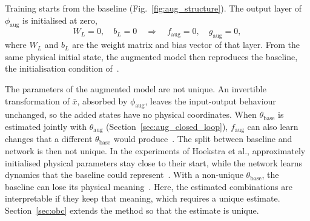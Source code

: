 Training starts from the baseline (Fig.~\ref{fig:aug_structure}).
The output layer of $\phi_{\mathrm{aug}}$ is initialised at zero,
\begin{equation}
 W_L=0,\quad b_L=0
 \quad\Longrightarrow\quad
 f_{\mathrm{aug}}=0,\quad g_{\mathrm{aug}}=0,
 \label{eq:aug_zero_init}
\end{equation}
where $W_L$ and $b_L$ are the weight matrix and bias vector of that layer.
From the same physical initial state, the augmented model then reproduces the
baseline, the initialisation condition of~\cite[Eq.~(29)]{hoekstra2026lfr}.

The parameters of the augmented model are not unique.
An invertible transformation of $\bar x$, absorbed by $\phi_{\mathrm{aug}}$,
leaves the input-output behaviour unchanged, so the added states have no
physical coordinates.
When $\theta_{\mathrm{base}}$ is estimated jointly with $\theta_{\mathrm{aug}}$
(Section~\ref{sec:aug_closed_loop}), $f_{\mathrm{aug}}$ can also learn changes
that a different $\theta_{\mathrm{base}}$ would
produce~\cite[Sec.~5.2]{hoekstra2026lfr}.
The split between baseline and network is then not unique.
In the experiments of Hoekstra et al., approximately initialised physical
parameters stay close to their start, while the network learns dynamics that
the baseline could represent~\cite[Sec.~6.3]{hoekstra2026lfr}.
With a non-unique $\theta_{\mathrm{base}}$, the baseline can lose its physical
meaning~\cite[Sec.~3]{gyorok2026obc}.
Here, the estimated combinations are interpretable if they keep that meaning,
which requires a unique estimate.
Section~\ref{sec:obc} extends the method so that the estimate is unique.


